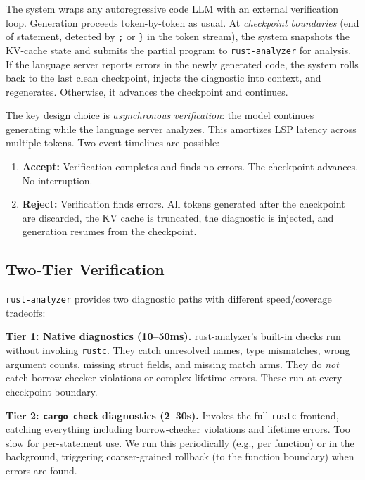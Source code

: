 \documentclass[11pt,letterpaper]{article}
\begin{document}
The system wraps any autoregressive code LLM with an external verification loop. Generation proceeds token-by-token as usual. At \emph{checkpoint boundaries} (end of statement, detected by \texttt{;} or \texttt{\}} in the token stream), the system snapshots the KV-cache state and submits the partial program to \texttt{rust-analyzer} for analysis. If the language server reports errors in the newly generated code, the system rolls back to the last clean checkpoint, injects the diagnostic into context, and regenerates. Otherwise, it advances the checkpoint and continues.

The key design choice is \emph{asynchronous verification}: the model continues generating while the language server analyzes. This amortizes LSP latency across multiple tokens. Two event timelines are possible:

\begin{enumerate}[leftmargin=*,itemsep=2pt]
  \item \textbf{Accept:} Verification completes and finds no errors. The checkpoint advances. No interruption.
  \item \textbf{Reject:} Verification finds errors. All tokens generated after the checkpoint are discarded, the KV cache is truncated, the diagnostic is injected, and generation resumes from the checkpoint.
\end{enumerate}

\subsection{Two-Tier Verification}

\texttt{rust-analyzer} provides two diagnostic paths with different speed/coverage tradeoffs:

\textbf{Tier 1: Native diagnostics (10--50ms).} rust-analyzer's built-in checks run without invoking \texttt{rustc}. They catch unresolved names, type mismatches, wrong argument counts, missing struct fields, and missing match arms. They do \emph{not} catch borrow-checker violations or complex lifetime errors. These run at every checkpoint boundary.

\textbf{Tier 2: \texttt{cargo check} diagnostics (2--30s).} Invokes the full \texttt{rustc} frontend, catching everything including borrow-checker violations and lifetime errors. Too slow for per-statement use. We run this periodically (e.g., per function) or in the background, triggering coarser-grained rollback (to the function boundary) when errors are found.
\end{document}
